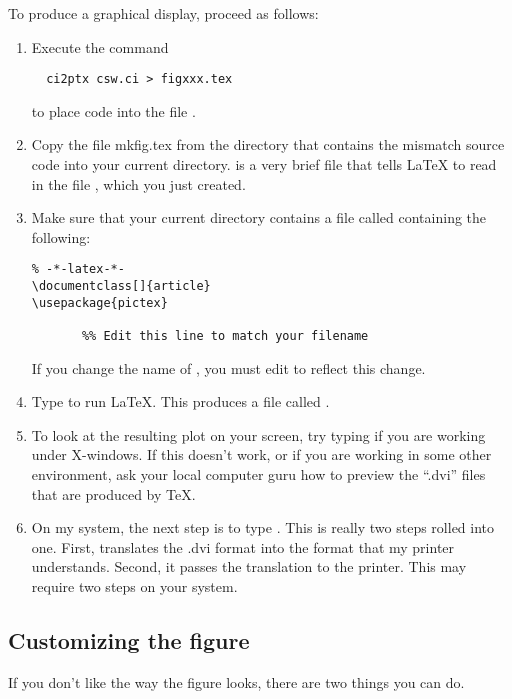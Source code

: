 To produce a graphical display, proceed as follows:
\begin{enumerate}
\item Execute the command 
\begin{verbatim}
  ci2ptx csw.ci > figxxx.tex
\end{verbatim}
to place \PiCTeX{} code into the file .  

\item Copy the file mkfig.tex from the directory that contains the
    mismatch source code into your current directory.   is
    a very brief file that tells \LaTeX{} to read in the file
    , which you just created.

\item Make sure that your current directory contains a file called
       containing the following:
\begin{verbatim}
% -*-latex-*-
\documentclass[]{article}
\usepackage{pictex}

       %% Edit this line to match your filename

\end{verbatim}
If you change the name of , you must edit
 to reflect this change.

\item Type  to run \LaTeX.  This produces a file called
    .

\item To look at the resulting plot on your screen, try typing
       if you are working under X-windows.  If this
      doesn't work, or if you are working in some other environment,
      ask your local computer guru how to preview the ``.dvi'' files
      that are produced by \TeX.

\item On my system, the next step is to type .  This
is really two steps rolled into one.  First,  translates the
.dvi format into the format that my printer understands.  Second, it
passes the translation to the printer.  This may require two steps on
your system.
\end{enumerate}

\subsection{Customizing the figure}

If you don't like the way the figure looks, there are two things you
can do.

